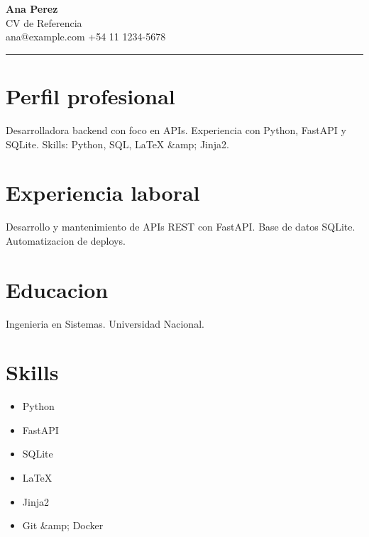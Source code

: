 \documentclass[11pt,a4paper]{article}
\begin{document}
{\LARGE \textbf{Ana Perez}}\\[0.35em]
{\large CV de Referencia}\\[0.35em]
ana@example.com \textbullet{} +54 11 1234-5678

\vspace{1.2em}
\hrule
\vspace{1.2em}

\section*{Perfil profesional}
Desarrolladora backend con foco en APIs. Experiencia con Python, FastAPI y SQLite. Skills: Python, SQL, LaTeX \&amp; Jinja2.

\section*{Experiencia laboral}
Desarrollo y mantenimiento de APIs REST con FastAPI. Base de datos SQLite. Automatizacion de deploys.

\section*{Educacion}
Ingenieria en Sistemas. Universidad Nacional.

\section*{Skills}
\begin{itemize}
  \item Python
  \item FastAPI
  \item SQLite
  \item LaTeX
  \item Jinja2
  \item Git \&amp; Docker
\end{itemize}
\end{document}
